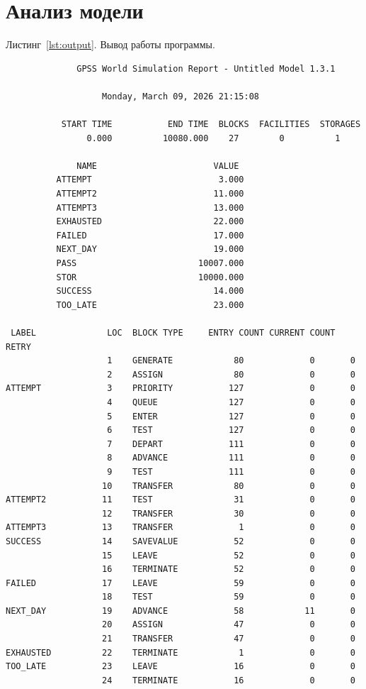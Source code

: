 \documentclass[a4paper, 14pt]{extarticle}
\begin{document}
\section{Анализ модели}

\label{lst:output}
Листинг~\ref{lst:output}. Вывод работы программы.

\begin{lstlisting}
              GPSS World Simulation Report - Untitled Model 1.3.1

                   Monday, March 09, 2026 21:15:08  

           START TIME           END TIME  BLOCKS  FACILITIES  STORAGES
                0.000          10080.000    27        0          1

              NAME                       VALUE  
          ATTEMPT                         3.000
          ATTEMPT2                       11.000
          ATTEMPT3                       13.000
          EXHAUSTED                      22.000
          FAILED                         17.000
          NEXT_DAY                       19.000
          PASS                        10007.000
          STOR                        10000.000
          SUCCESS                        14.000
          TOO_LATE                       23.000

 LABEL              LOC  BLOCK TYPE     ENTRY COUNT CURRENT COUNT RETRY
                    1    GENERATE            80             0       0
                    2    ASSIGN              80             0       0
ATTEMPT             3    PRIORITY           127             0       0
                    4    QUEUE              127             0       0
                    5    ENTER              127             0       0
                    6    TEST               127             0       0
                    7    DEPART             111             0       0
                    8    ADVANCE            111             0       0
                    9    TEST               111             0       0
                   10    TRANSFER            80             0       0
ATTEMPT2           11    TEST                31             0       0
                   12    TRANSFER            30             0       0
ATTEMPT3           13    TRANSFER             1             0       0
SUCCESS            14    SAVEVALUE           52             0       0
                   15    LEAVE               52             0       0
                   16    TERMINATE           52             0       0
FAILED             17    LEAVE               59             0       0
                   18    TEST                59             0       0
NEXT_DAY           19    ADVANCE             58            11       0
                   20    ASSIGN              47             0       0
                   21    TRANSFER            47             0       0
EXHAUSTED          22    TERMINATE            1             0       0
TOO_LATE           23    LEAVE               16             0       0
                   24    TERMINATE           16             0       0


\end{lstlisting}
\end{document}
